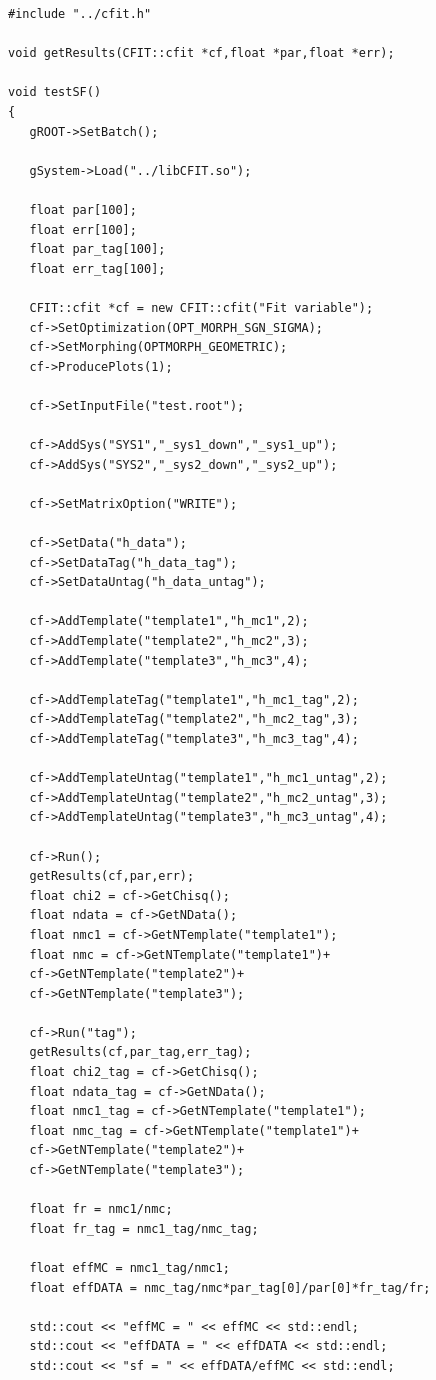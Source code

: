 \documentclass[12pt]{article}
\begin{document}
\begin{verbatim}
#include "../cfit.h"

void getResults(CFIT::cfit *cf,float *par,float *err);

void testSF()
{
   gROOT->SetBatch();
   
   gSystem->Load("../libCFIT.so");

   float par[100];
   float err[100];
   float par_tag[100];
   float err_tag[100];
   
   CFIT::cfit *cf = new CFIT::cfit("Fit variable");
   cf->SetOptimization(OPT_MORPH_SGN_SIGMA);
   cf->SetMorphing(OPTMORPH_GEOMETRIC);
   cf->ProducePlots(1);
   
   cf->SetInputFile("test.root");

   cf->AddSys("SYS1","_sys1_down","_sys1_up");
   cf->AddSys("SYS2","_sys2_down","_sys2_up");

   cf->SetMatrixOption("WRITE");
   
   cf->SetData("h_data");
   cf->SetDataTag("h_data_tag");
   cf->SetDataUntag("h_data_untag");
   
   cf->AddTemplate("template1","h_mc1",2);
   cf->AddTemplate("template2","h_mc2",3);
   cf->AddTemplate("template3","h_mc3",4);

   cf->AddTemplateTag("template1","h_mc1_tag",2);
   cf->AddTemplateTag("template2","h_mc2_tag",3);
   cf->AddTemplateTag("template3","h_mc3_tag",4);

   cf->AddTemplateUntag("template1","h_mc1_untag",2);
   cf->AddTemplateUntag("template2","h_mc2_untag",3);
   cf->AddTemplateUntag("template3","h_mc3_untag",4);
   
   cf->Run();   
   getResults(cf,par,err);
   float chi2 = cf->GetChisq();
   float ndata = cf->GetNData();
   float nmc1 = cf->GetNTemplate("template1");
   float nmc = cf->GetNTemplate("template1")+
   cf->GetNTemplate("template2")+
   cf->GetNTemplate("template3");

   cf->Run("tag");   
   getResults(cf,par_tag,err_tag);
   float chi2_tag = cf->GetChisq();
   float ndata_tag = cf->GetNData();
   float nmc1_tag = cf->GetNTemplate("template1");
   float nmc_tag = cf->GetNTemplate("template1")+
   cf->GetNTemplate("template2")+
   cf->GetNTemplate("template3");

   float fr = nmc1/nmc;
   float fr_tag = nmc1_tag/nmc_tag;
   
   float effMC = nmc1_tag/nmc1;
   float effDATA = nmc_tag/nmc*par_tag[0]/par[0]*fr_tag/fr;
   
   std::cout << "effMC = " << effMC << std::endl;
   std::cout << "effDATA = " << effDATA << std::endl;
   std::cout << "sf = " << effDATA/effMC << std::endl;


\end{verbatim}
\end{document}
